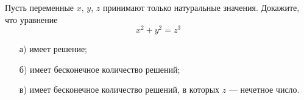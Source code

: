 
Пусть переменные $x$, $y$, $z$ принимают только натуральные значения. Докажите, что уравнение 
$$x^{2}+y^{2}=z^{3}
$$

\begin{enumerate}
    \item [а)] имеет решение;

    \item [б)] имеет бесконечное количество решений;

    \item [в)] имеет бесконечное количество решений, в которых $z$ --- нечетное число.
\end{enumerate}